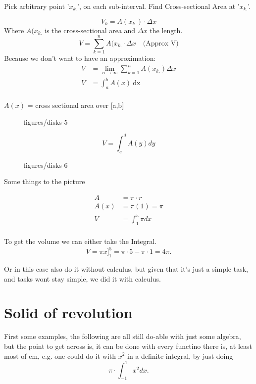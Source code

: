 \documentclass{book}
\begin{document}
Pick arbitrary point '$x_{k.}$', on each sub-interval. Find Cross-sectional Area at '$x_{k.}$'.

\[ V_k=A(x_{k.})\cdot \Delta x \] 
Where $A(x_{k.}$ is the cross-sectional area and $\Delta x$ the length.
\[V=\sum^n_{k=1} A(x_{k.}\cdot \Delta x \quad  \text{(Approx V)} \] 
Because we don't want to have an approximation:
\begin{align*}
    V&= \lim_{n\to\infty} \sum^n_{k=1}A(x_{k.})\Delta x \\
    V&= \int_{a}^{b} A(x) \ \text{dx}  \\
\end{align*}

$A(x)$ = cross sectional area over [a,b]

\vspace{50pt}


\begin{figure}[ht]
    \centering
    \caption{figures/disks-5}
    \label{fig:disks-5}
\end{figure}

\[V=\int_{c}^{d} A(y) dy\] 

\begin{figure}[ht]
    \centering
    \caption{figures/disks-6}
    \label{fig:disks-6}
\end{figure}

Some things to the picture

\begin{align*}
    A &= \pi\cdot r \\
    A(x) &= \pi(1)=\pi \\
    V&= \int_{1}^{5} \pi dx  \\
\end{align*}

To get the volume we can either take the Integral.
\[ V=\pi x ]^5_1=\pi\cdot 5-\pi\cdot 1=4\pi .\] 

Or in this case also do it without calculus, but given that it's just a simple
task, and tasks wont stay simple, we did it with calculus.

\clearpage
\section{Solid of revolution}

First some examples, the following are all still do-able with just some
algebra, but the point to get across is, it can be done with every functino
there is, at least most of em, e.g. one could do it with $x^2$ in a definite
integral, by just doing 
\[ \pi\cdot \int_{-1}^{1} x^2 dx .\] 
\end{document}

